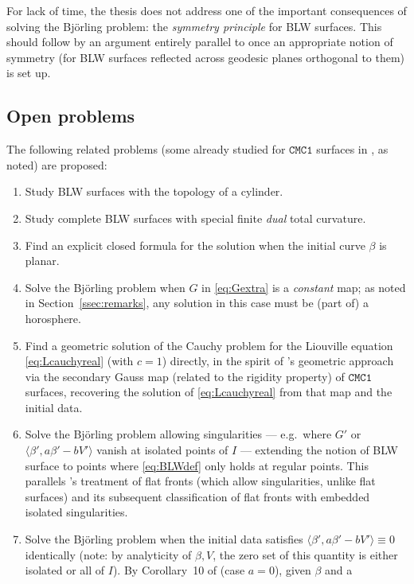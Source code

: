 \documentclass[11pt,a4paper]{article}
\newcommand{\ip}[2]{\langle #1,#2\rangle}            %
\theoremstyle{plain}
\theoremstyle{definition}
\theoremstyle{remark}
\begin{document}
For lack of time, the thesis does not address one of the important
consequences of solving the Björling problem: the \emph{symmetry
principle} for BLW surfaces. This should follow by an argument entirely
parallel to \cite{GMM1} once an appropriate notion of symmetry (for BLW
surfaces reflected across geodesic planes orthogonal to them) is set up.

\subsection*{Open problems}
The following related problems (some already studied for $\mathtt{CMC1}$
surfaces in \cite{GMM1}, as noted) are proposed:
\begin{enumerate}[label=\arabic*.]
\item Study BLW surfaces with the topology of a cylinder.
\item Study complete BLW surfaces with special finite \emph{dual} total
  curvature.
\item Find an explicit closed formula for the solution when the initial
  curve $\beta$ is planar.
\item\label{open:G.equiv.0} Solve the Björling problem when $G$ in
  \eqref{eq:Gextra} is a \emph{constant} map; as noted in
  Section~\ref{ssec:remarks}, any solution in this case must be (part of)
  a horosphere.
\item Find a geometric solution of the Cauchy problem for the Liouville
  equation \eqref{eq:Lcauchyreal} (with $c=1$) directly, in the spirit of
  \cite{GMM1}'s geometric approach via the secondary Gauss map (related
  to the rigidity property) of $\mathtt{CMC1}$ surfaces, recovering the
  solution of \eqref{eq:Lcauchyreal} from that map and the initial data.
\item\label{open:singularity.1} Solve the Björling problem allowing
  singularities — e.g.\ where $G'$ or $\ip{\beta'}{a\beta'-bV'}$ vanish at
  isolated points of $I$ — extending the notion of BLW surface to points
  where \eqref{eq:BLWdef} only holds at regular points. This parallels
  \cite{GMM5}'s treatment of flat fronts (which allow singularities,
  unlike flat surfaces) and its subsequent classification of flat fronts
  with embedded isolated singularities.
\item Solve the Björling problem when the initial data satisfies
  $\ip{\beta'}{a\beta'-bV'}\equiv0$ identically (note: by analyticity of
  $\beta,V$, the zero set of this quantity is either isolated or all of
  $I$). By Corollary~10 of \cite{GMM5} (case $a=0$), given $\beta$ and a

\end{enumerate}
\end{document}
